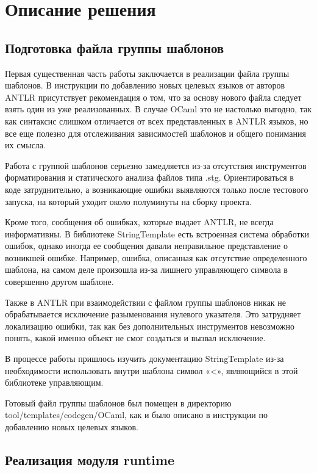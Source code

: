 
\section{Описание решения}

\subsection{Подготовка файла группы шаблонов}
\label{subsec:string_template_group}

Первая существенная часть работы заключается в реализации файла группы шаблонов. 
В инструкции по добавлению новых целевых языков от авторов ANTLR присутствует рекомендация о том, что за основу нового файла следует взять один из уже реализованных. 
В случае OCaml это не настолько выгодно, так как синтаксис слишком отличается от всех представленных в ANTLR языков, но все еще полезно для отслеживания зависимостей шаблонов и общего понимания их смысла. 

Работа с группой шаблонов серьезно замедляется из-за отсутствия инструментов форматирования и статического анализа файлов типа .stg. 
Ориентироваться в коде затруднительно, а возникающие ошибки выявляются только после тестового запуска, на который уходит около полуминуты на сборку проекта.

Кроме того, сообщения об ошибках, которые выдает ANTLR, не всегда информативны. 
В библиотеке StringTemplate есть встроенная система обработки ошибок, однако иногда ее сообщения давали неправильное представление о возникшей ошибке. 
Например, ошибка, описанная как отсутствие определенного шаблона, на самом деле произошла из-за лишнего управляющего символа в совершенно другом шаблоне. 

Также в ANTLR при взаимодействии с файлом группы шаблонов никак не обрабатывается исключение разыменования нулевого указателя. 
Это затрудняет локализацию ошибки, так как без дополнительных инструментов невозможно понять, какой именно объект не смог создаться и вызвал исключение. 

В процессе работы пришлось изучить документацию StringTemplate из-за необходимости использовать внутри шаблона символ «<», являющийся в этой библиотеке управляющим. 

Готовый файл группы шаблонов был помещен в директорию tool/templates/codegen/OCaml, как и было описано в инструкции по добавлению новых целевых языков.

\subsection{Реализация модуля runtime}
\label{subsec:runtime_realization}

